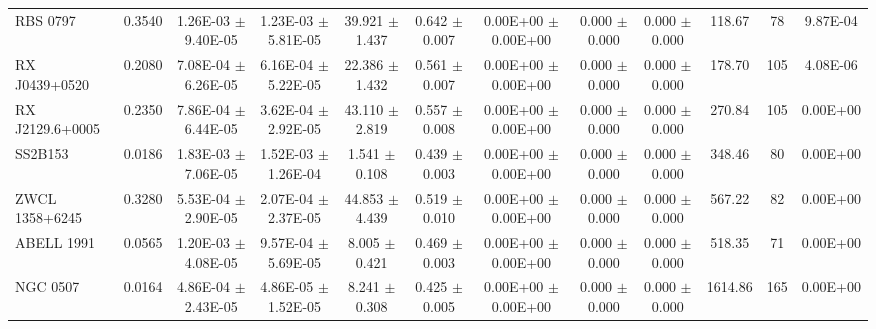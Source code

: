 \documentclass{article}
\begin{document}
\begin{landscape}
\begin{center}
\begin{longtable}{lccccccccccc}
RBS 0797            \dotfill &  0.3540     &     1.26E-03  $\pm$    9.40E-05     &     1.23E-03  $\pm$    5.81E-05     &       39.921  $\pm$       1.437     &        0.642  $\pm$       0.007     &     0.00E+00  $\pm$    0.00E+00     &        0.000  $\pm$       0.000     &        0.000  $\pm$       0.000     &   118.67 &    78 &     9.87E-04\\
RX J0439+0520       \dotfill &  0.2080     &     7.08E-04  $\pm$    6.26E-05     &     6.16E-04  $\pm$    5.22E-05     &       22.386  $\pm$       1.432     &        0.561  $\pm$       0.007     &     0.00E+00  $\pm$    0.00E+00     &        0.000  $\pm$       0.000     &        0.000  $\pm$       0.000     &   178.70 &   105 &     4.08E-06\\
RX J2129.6+0005     \dotfill &  0.2350     &     7.86E-04  $\pm$    6.44E-05     &     3.62E-04  $\pm$    2.92E-05     &       43.110  $\pm$       2.819     &        0.557  $\pm$       0.008     &     0.00E+00  $\pm$    0.00E+00     &        0.000  $\pm$       0.000     &        0.000  $\pm$       0.000     &   270.84 &   105 &     0.00E+00\\
SS2B153             \dotfill &  0.0186     &     1.83E-03  $\pm$    7.06E-05     &     1.52E-03  $\pm$    1.26E-04     &        1.541  $\pm$       0.108     &        0.439  $\pm$       0.003     &     0.00E+00  $\pm$    0.00E+00     &        0.000  $\pm$       0.000     &        0.000  $\pm$       0.000     &   348.46 &    80 &     0.00E+00\\
ZWCL 1358+6245      \dotfill &  0.3280     &     5.53E-04  $\pm$    2.90E-05     &     2.07E-04  $\pm$    2.37E-05     &       44.853  $\pm$       4.439     &        0.519  $\pm$       0.010     &     0.00E+00  $\pm$    0.00E+00     &        0.000  $\pm$       0.000     &        0.000  $\pm$       0.000     &   567.22 &    82 &     0.00E+00\\
ABELL 1991          \dotfill &  0.0565     &     1.20E-03  $\pm$    4.08E-05     &     9.57E-04  $\pm$    5.69E-05     &        8.005  $\pm$       0.421     &        0.469  $\pm$       0.003     &     0.00E+00  $\pm$    0.00E+00     &        0.000  $\pm$       0.000     &        0.000  $\pm$       0.000     &   518.35 &    71 &     0.00E+00\\
NGC 0507            \dotfill &  0.0164     &     4.86E-04  $\pm$    2.43E-05     &     4.86E-05  $\pm$    1.52E-05     &        8.241  $\pm$       0.308     &        0.425  $\pm$       0.005     &     0.00E+00  $\pm$    0.00E+00     &        0.000  $\pm$       0.000     &        0.000  $\pm$       0.000     &  1614.86 &   165 &     0.00E+00\\
\hline
\end{longtable}
\end{center}
\end{landscape}
\end{document}
